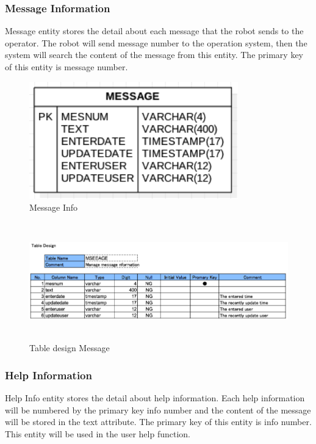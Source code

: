 \documentclass[11pt, a4paper]{article}
\begin{document}
\subsubsection{Message Information}
Message entity stores the detail about each message that the robot sends to the operator. The robot will send message number to the operation system, then the system will search the content of the message from this entity. The primary key of this entity is message number.

\begin{figure}[H]
\centering
\includegraphics[height=2in]{MIN}
\caption[Message Info]{Message Info}
\end{figure}

\begin{figure}[H]
\centering
\includegraphics[height=2in]{ME}
\caption[Table design Message]{Table design Message}
\end{figure}

\subsubsection{Help Information}
Help Info entity stores the detail about help information. Each help information will be numbered by the primary key info number and the content of the message will be stored in the text attribute. The primary key of this entity is info number. This entity will be used in the user help function.
\end{document}
